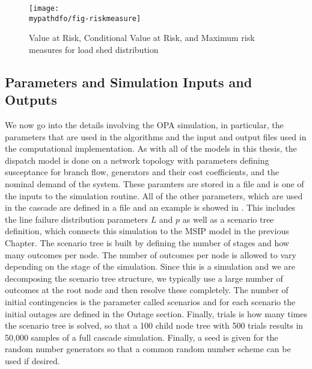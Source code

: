 \begin{figure}
\centering
\texttt{[image: \\mypathdfo/fig-riskmeasure]}
\caption[Risk Measures]{Value at Risk, Conditional Value at Risk, and Maximum risk measures for load shed distribution}\label{fig:riskmeasure}
\end{figure}



\subsection{Parameters and Simulation Inputs and Outputs}
We now go into the details involving the OPA simulation, in particular, the parameters that are used in the algorithms and the input and output files used in the computational implementation. As with all of the models in this thesis, the dispatch model is done on a network topology with parameters defining susceptance for branch flow, generators and their cost coefficients, and the nominal demand of the system.  These paramters are stored in a  file and is one of the inputs to the simulation routine.  All of the other parameters, which are used in the cascade  are defined in a  file and an example is showed in .  This includes the line failure distribution parameters $L$ and $p$ as well as a scenario tree definition, which connects this simulation to the MSIP model in the previous Chapter.  The scenario tree is built by defining the number of stages and how many outcomes per node.  The number of outcomes per node is allowed to vary depending on the stage of the simulation.  Since this is a simulation and we are decomposing the scenario tree structure, we typically use a large number of outcomes at the root node and then resolve these completely.  The number of initial contingencies is the parameter called scenarios and for each scenario the initial outages are defined in the Outage section.  Finally, trials is how many times the scenario tree is solved, so that a 100 child node tree with 500 trials results in 50,000 samples of a full cascade simulation.  Finally, a seed is given for the random number generators so that a common random number scheme can be used if desired.

